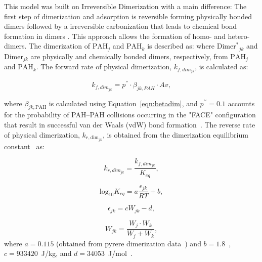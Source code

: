 This model was built on Irreversible Dimerization with a main difference: The first step of dimerization and adsorption is reversible forming physically bonded dimers followed by a irreversible carbonization that leads to chemical bond formation in dimers \citep{kholghy2018reactive}. This approach allows the formation of homo- and hetero-dimers. The dimerization of $\mathrm{PAH}_j$ and $\mathrm{PAH}_k$ is described as:
\noindent where $\mathrm{Dimer^*}_{jk}$ and $\mathrm{Dimer}_{jk}$ are physically and chemically bonded dimers, respectively, from $\mathrm{PAH}_j$ and $\mathrm{PAH}_k$. The forward rate of physical dimerization, ${k_{f,dim_{jk}}}$, is calculated as:

\begin{equation}
	k_{f,dim_{jk}}=
	p^{''}\cdot\beta_{jk,PAH}\cdot Av
	\label{eqn:kfphydim_reacdim},
\end{equation}

\noindent where $\beta_{jk,\mathrm{PAH}}$ is calculated using Equation~\eqref{eqn:betadim}, and $p^{\prime\prime} = 0.1$ accounts for the probability of PAH–PAH collisions occurring in the "FACE" configuration that result in successful van der Waals (vdW) bond formation~\citep{miller1984intermolecular}. The reverse rate of physical dimerization, $k_{r,\mathrm{dim}_{jk}}$, is obtained from the dimerization equilibrium constant~\citep{miller1991kinetics} as:


\begin{equation}
	k_{r,dim_{jk}} = \frac{k_{f,dim_{jk}}}{K_{eq}} 
	\label{eqn:krphydim_reacdim},
\end{equation}

\begin{equation}
	\mathrm{log}_{10}K_{eq}=
	a\frac{\epsilon_{jk}}{RT}+b
	\label{eqn:keq_reacdim},
\end{equation}

\begin{equation}
	\epsilon_{jk} = cW_{jk} -d
	\label{eqn:epsilon_reacdim},
\end{equation}

\begin{equation}
	W_{jk} = \frac{W_j\cdot W_k}{W_j+W_k}
	\label{eqn:Wjk_reacdim},
\end{equation}
\noindent where $a=0.115$ (obtained from pyrere dimerization data~\citep{sabbah2010exploring}) and $b=1.8$~\citep{kholghy2018reactive}, $c=933420$~J/kg, and $d=34053$~J/mol~\cite{kholghy2018reactive}. 

